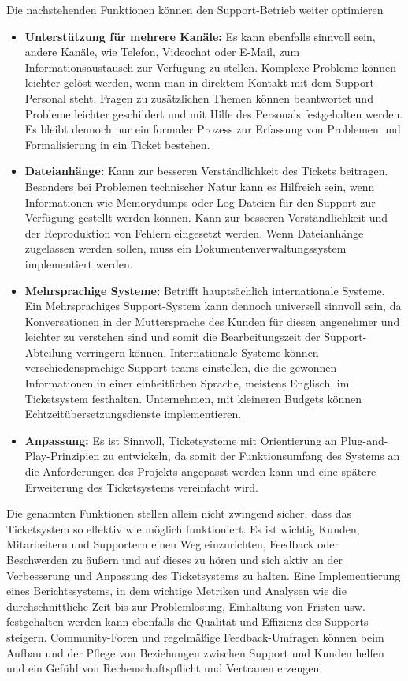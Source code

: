 Die nachstehenden Funktionen können den Support-Betrieb weiter optimieren
\begin{itemize}
	\item \textbf{Unterstützung für mehrere Kanäle:} Es kann ebenfalls sinnvoll sein, andere Kanäle, wie Telefon, Videochat oder E-Mail, zum Informationsaustausch zur Verfügung zu stellen. Komplexe Probleme können leichter gelöst werden, wenn man in direktem Kontakt mit dem Support-Personal steht. Fragen zu zusätzlichen Themen können beantwortet und Probleme leichter geschildert und mit Hilfe des Personals festgehalten werden. Es bleibt dennoch nur ein formaler Prozess zur Erfassung von Problemen und Formalisierung in ein Ticket bestehen.
	\item \textbf{Dateianhänge:} Kann zur besseren Verständlichkeit des Tickets beitragen. Besonders bei Problemen technischer Natur kann es Hilfreich sein, wenn Informationen wie Memorydumps oder Log-Dateien für den Support zur Verfügung gestellt werden können. Kann zur besseren Verständlichkeit und der Reproduktion von Fehlern eingesetzt werden. Wenn Dateianhänge zugelassen werden sollen, muss ein Dokumentenverwaltungssystem implementiert werden.
	\item \textbf{Mehrsprachige Systeme:} Betrifft hauptsächlich internationale Systeme. Ein Mehrsprachiges Support-System kann dennoch universell sinnvoll sein, da Konversationen in der Muttersprache des Kunden für diesen angenehmer und leichter zu verstehen sind und somit die Bearbeitungszeit der Support-Abteilung verringern können. Internationale Systeme können verschiedensprachige Support-teams einstellen, die die gewonnen Informationen in einer einheitlichen Sprache, meistens Englisch, im Ticketsystem festhalten. Unternehmen, mit kleineren Budgets können Echtzeitübersetzungsdienste implementieren.
	\item \textbf{Anpassung:} Es ist Sinnvoll, Ticketsysteme mit Orientierung an Plug-and-Play-Prinzipien zu entwickeln, da somit der Funktionsumfang des Systems an die Anforderungen des Projekts angepasst werden kann und eine spätere Erweiterung des Ticketsystems vereinfacht wird.
\end{itemize}  
Die genannten Funktionen stellen allein nicht zwingend sicher, dass das Ticketsystem so effektiv wie möglich funktioniert. Es ist wichtig Kunden, Mitarbeitern und Supportern einen Weg einzurichten, Feedback oder Beschwerden zu äußern und auf dieses zu hören und sich aktiv an der Verbesserung und Anpassung des Ticketsystems zu halten. 
Eine Implementierung eines Berichtssystems, in dem wichtige Metriken und Analysen wie die durchschnittliche Zeit bis zur Problemlösung, Einhaltung von Fristen usw. festgehalten werden kann ebenfalls die Qualität und Effizienz des Supports steigern. 
Community-Foren und regelmäßige Feedback-Umfragen können beim Aufbau und der Pflege von Beziehungen zwischen Support und Kunden helfen und ein Gefühl von Rechenschaftspflicht und Vertrauen erzeugen.
